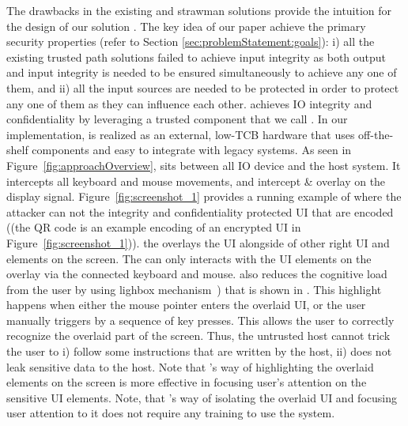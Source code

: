  The drawbacks in the existing and strawman solutions provide the intuition for the design of our solution \name. The key idea of our paper achieve the primary security properties (refer to Section \ref{sec:problemStatement:goals}): i) all the existing trusted path solutions failed to achieve input integrity as both output and input integrity is needed to be ensured simultaneously to achieve any one of them, and ii) all the input sources are needed to be protected in order to protect any one of them as they can influence each other. \name achieves IO integrity and confidentiality by leveraging a trusted component that we call \device. In our implementation, \device is realized as an external, low-TCB hardware that uses off-the-shelf components and easy to integrate with legacy systems. As seen in Figure~\ref{fig:approachOverview}, \device sits between all IO device and the host system. It intercepts all keyboard and mouse movements, and intercept \& overlay on the display signal. Figure~\ref{fig:screenshot_1} provides a running example of \name where \one the attacker can not the integrity and confidentiality protected UI that are encoded ((the QR code is an example encoding of an encrypted UI in Figure~\ref{fig:screenshot_1})). \two the \device overlays the UI alongside of other right UI and \js elements on the screen. The \device can only interacts with the UI elements on the overlay via the connected keyboard and mouse. \name also reduces the cognitive load from the user by using lighbox mechanism~\cite{huang2012clickjacking}) that is shown in \four. This highlight happens when either the mouse pointer enters the overlaid UI, or the user manually triggers by a sequence of key presses. This allows the user to correctly recognize the overlaid part of the screen. Thus, the untrusted host cannot trick the user to i) follow some instructions that are written by the host, ii) does not leak sensitive data to the host. Note that \name's way of highlighting the overlaid elements on the screen is more effective in focusing user's attention on the sensitive UI elements. Note, that \name's way of isolating the overlaid UI and focusing user attention to it does not require any training to use the system.



